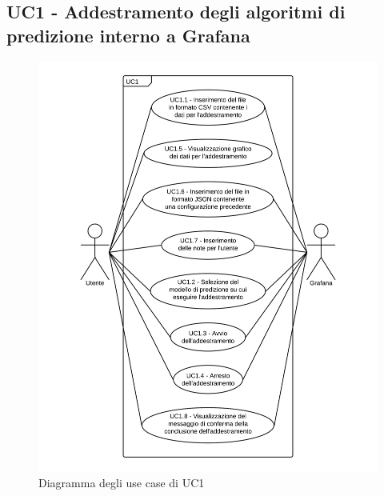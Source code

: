 \subsection{UC1 - Addestramento degli algoritmi di predizione interno a Grafana}
\begin{figure}[H]
\includegraphics[width=\textwidth,height=\textheight,keepaspectratio]{img/UC1_-_Addestramento_degli_algoritmi_di_predizione_interno_a_Grafana.png}
\caption{Diagramma degli use case di UC1}
\end{figure}
